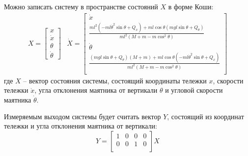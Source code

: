 Можно записать систему в пространстве состояний $X$ в форме Коши: 
\begin{equation}
    \begin{array}{cc}
        X = \begin{bmatrix} 
            x \\
            \dot{x} \\
            \theta \\
            \dot{\theta}
    \end{bmatrix} & 
    \dot{X} = \begin{bmatrix}
        \dot{x} \\
        \frac{ml^2(-ml\dot{\theta}^2\sin\theta + Q_x) + ml\cos\theta(mgl\sin\theta + Q_{\theta})}{ml^2(M + m - m\cos^2\theta)} \\ 
        \dot{\theta} \\
        \frac{(mgl\sin\theta + Q_{\theta})(M + m) + ml\cos\theta(-ml\dot{\theta}^2\sin\theta + Q_x) }{ml^2(M + m - m\cos^2\theta)} \\ 
    \end{bmatrix}
    \end{array}
\end{equation}
где $X$ -- вектор состояния системы, состоящий координаты тележки $x$, скорости тележки $\dot{x}$, угла отклонения маятника от вертикали $\theta$ и угловой скорости маятника $\dot{\theta}$. 

Измеряемым выходом системы будет считать вектор $Y$, состоящий из координат тележки и угла отклонения маятника от вертикали:
\begin{equation}
    Y = \begin{bmatrix}
        1 & 0 & 0 & 0 \\
        0 & 0 & 1 & 0 \\ 
    \end{bmatrix} X
\end{equation}

